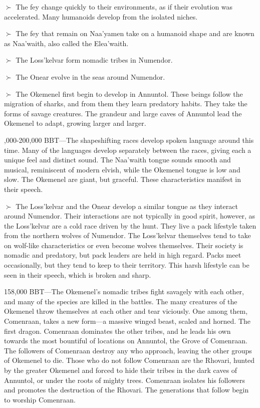 \documentclass[smalldemyvopaper,11pt,twoside,onecolumn,openright,extrafontsizes]{memoir}
\begin{document}
{{$\succ$ The fey change quickly to their environments, as if their evolution was accelerated. Many humanoids develop from the isolated niches.

$\succ$ The fey that remain on Naa’yamen take on a humanoid shape and are known as Naa'waith, also called the Elea'waith.

$\succ$ The Loss’kelvar form nomadic tribes in Numendor.

$\succ$ The Onear evolve in the seas around Numendor.

$\succ$ The Okemenel first begin to develop in Annuntol. These beings follow the migration of sharks, and from them they learn predatory habits. They take the forms of savage creatures. The grandeur and large caves of Annuntol lead the Okemenel to adapt, growing larger and larger.

\par\vfill{},000-200,000 BBT—The shapeshifting races develop spoken language around this time. Many of the languages develop separately between the races, giving each a unique feel and distinct sound. The Naa’waith tongue sounds smooth and musical, reminiscent of modern elvish, while the Okemenel tongue is low and slow. The Okemenel are giant, but graceful. These characteristics manifest in their speech.

$\succ$ The Loss’kelvar and the Onear develop a similar tongue as they interact around Numendor. Their interactions are not typically in good spirit, however, as the Loss’kelvar are a cold race driven by the hunt. They live a pack lifestyle taken from the northern wolves of Numendor. The Loss’kelvar themselves tend to take on wolf-like characteristics or even become wolves themselves. Their society is nomadic and predatory, but pack leaders are held in high regard. Packs meet occasionally, but they tend to keep to their territory. This harsh lifestyle can be seen in their speech, which is broken and sharp.

158,000 BBT—The Okemenel’s nomadic tribes fight savagely with each other, and many of the species are killed in the battles. The many creatures of the Okemenel throw themselves at each other and tear viciously. One among them, Comenraan, takes a new form—a massive winged beast, scaled and horned. The first dragon. Comenraan dominates the other tribes, and he leads his own towards the most bountiful of locations on Annuntol, the Grove of Comenraan. The followers of Comenraan destroy any who approach, leaving the other groups of Okemenel to die. Those who do not follow Comenraan are the Rhovari, hunted by the greater Okemenel and forced to hide their tribes in the dark caves of Annuntol, or under the roots of mighty trees. Comenraan isolates his followers and promotes the destruction of the Rhovari. The generations that follow begin to worship Comenraan.

}}
\end{document}
